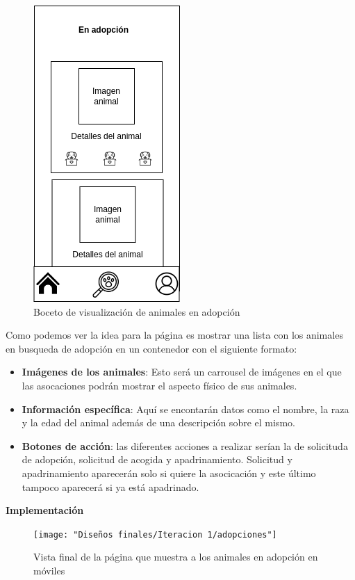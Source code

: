 \begin{figure}[H]
	\centering
	\includegraphics[width=0.31\linewidth]{"bocetos/iteracion 1/adopciones.drawio"}
	\caption{Boceto de visualización de animales en adopción}
	\label{fig:adopciones}
\end{figure}

Como podemos ver la idea para la página es mostrar una lista con los animales en busqueda de adopción en un contenedor con el siguiente formato:

\begin{itemize}
	\item \textbf{Imágenes de los animales}: Esto será un carrousel de imágenes en el que las asocaciones podrán mostrar el aspecto físico de sus animales.
	\item \textbf{Información específica}: Aquí se encontarán datos como el nombre, la raza y la edad del animal además de una descripción sobre el mismo.
	\item \textbf{Botones de acción}: las diferentes acciones a realizar serían la de solicituda de adopción, solicitud de acogida y apadrinamiento. Solicitud y apadrinamiento aparecerán solo si quiere la asocicación y este último tampoco aparecerá si ya está apadrinado.
\end{itemize}

\textbf{Implementación} %

\begin{figure}[H]
		\centering
		\texttt{[image: "Diseños finales/Iteracion 1/adopciones"]}
		\caption{Vista final de la página que muestra a los animales en adopción en móviles}
		\label{fig:adopcionesDef}
\end{figure}


